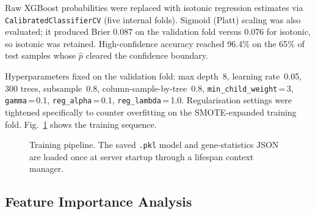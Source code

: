 \documentclass[12pt,a4paper]{article}
\begin{document}
Raw XGBoost probabilities were replaced with isotonic regression
estimates via \texttt{CalibratedClassifierCV} (five internal folds).
Sigmoid (Platt) scaling was also evaluated; it produced Brier 0.087
on the validation fold versus 0.076 for isotonic, so isotonic was
retained. High-confidence accuracy reached 96.4\% on the 65\% of
test samples whose $\hat{p}$ cleared the confidence boundary.

Hyperparameters fixed on the validation fold: max depth~8, learning
rate~0.05, 300 trees, subsample~0.8, column-sample-by-tree~0.8,
\texttt{min\_child\_weight}\,=\,3, \texttt{gamma}\,=\,0.1,
\texttt{reg\_alpha}\,=\,0.1, \texttt{reg\_lambda}\,=\,1.0.
Regularisation settings were tightened specifically to counter
overfitting on the SMOTE-expanded training fold.
Fig.~\ref{fig:trainflow} shows the training sequence.

\begin{figure}[H]
\centering
{}
\caption{Training pipeline. The saved \texttt{.pkl} model and
         gene-statistics JSON are loaded once at server startup
         through a lifespan context manager.}
\label{fig:trainflow}
\end{figure}

\subsection{Feature Importance Analysis}
\end{document}
